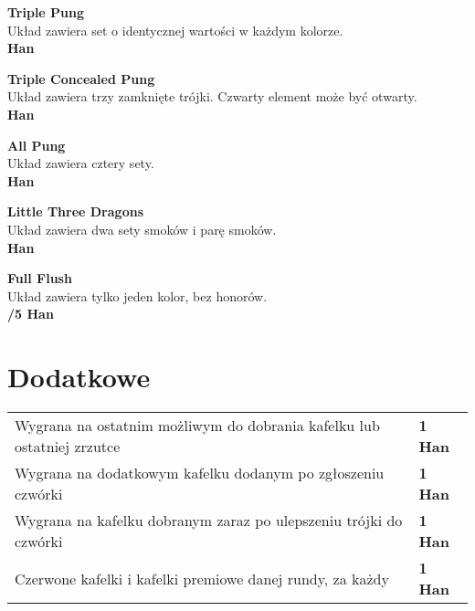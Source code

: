 \documentclass[12pt, a4paper]{article}
\newcommand{\han}[1]{\\ \textbf{\color{BrickRed}\link{#1 }\color{Black}Han}}
\newcommand{\chan}[2]{\\ \textbf{\color{PineGreen}\link{#1}\color{Black}/\color{BrickRed}#2 \color{Black}Han}}
\begin{document}
    \textbf{Triple Pung \\}
    Układ zawiera set o identycznej wartości w każdym kolorze. \han{2}

    \textbf{Triple Concealed Pung \\}
    Układ zawiera trzy zamknięte trójki. Czwarty element może być otwarty. \han{2}

    \textbf{All Pung \\}
    Układ zawiera cztery sety. \han{2}

    \textbf{Little Three Dragons \\}
    Układ zawiera dwa sety smoków i parę smoków. \han{2}

    \textbf{Full Flush \\}
    Układ zawiera tylko jeden kolor, bez honorów. \chan{4}{5}


    \pagebreak
    \section*{Dodatkowe}
    \begin{table}[h!]
        \centering
        \begin{tabular}{p{11cm}p{2cm}}
            Wygrana na ostatnim możliwym do dobrania kafelku lub ostatniej zrzutce & \textbf{1 Han} \\[2em]
            Wygrana na dodatkowym kafelku dodanym po zgłoszeniu czwórki & \textbf{1 Han} \\[2em]
            Wygrana na kafelku dobranym zaraz po ulepszeniu trójki do czwórki & \textbf{1 Han} \\[2em]
            Czerwone kafelki i kafelki premiowe danej rundy, za każdy & \textbf{1 Han} \\[2em]
        \end{tabular}
    \end{table}
\end{document}
